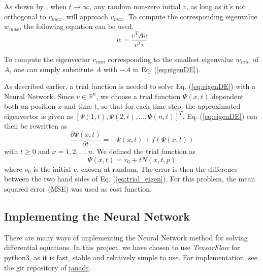 As shown by \cite{yi2004neural}, when $t\rightarrow \infty$, any random non-zero initial $v$, as long as it's not orthogonal to $v_{max}$, will approach $v_{max}$. To compute the corresponding eigenvalue $w_{max}$, the following equation can be used.
\begin{equation*}\label{eq:find_w}
	w = \frac{v^TAv}{v^Tv}
\end{equation*}

To compute the eigenvector $v_{min}$ corresponding to the smallest eigenvalue $w_{min}$ of $A$, one can simply substitute $A$ with $-A$ in Eq. (\ref{eq:eigenDE}).

As described earlier, a trial function is needed to solve Eq. (\ref{eq:eigenDE}) with a Neural Network. Since $v \in \mathbb{R}^n$, we choose a trial function $\Psi(x,t)$ dependent both on position $x$ and time $t$, so that for each time step, the approximated eigenvector is given as $[\Psi(1,t), \Psi(2,t), \ldots, \Psi(n,t)]^T$. Eq. (\ref{eq:eigenDE}) can then be rewritten as
\begin{equation}\label{eq:trial_eigen}
	\frac{\partial \Psi(x,t)}{\partial t} = -\Psi(x,t) + f(\Psi(x,t))
\end{equation}
with $t \geq 0$ and $x=1,2,\ldots,n$. We defined the trial function as
\begin{equation*}
	 \Psi(x,t) = v_0 + tN(x,t,p)
\end{equation*}
where $v_0$ is the initial $v$, chosen at random.
The error is then the difference between the two hand sides of Eq. (\ref{eq:trial_eigen}). For this problem, the mean squared error (MSE) was used as cost function.

\subsection{Implementing the Neural Network}
There are many ways of implementing the Neural Network method for solving differential equations. In this project, we have chosen to use \textit{TensorFlow} for python3, as it is fast, stable and relatively simple to use. For implementation, see the git repository of \href{https://github.com/janadr/FYS-STK4155/tree/master/project3/code}{janadr}.
